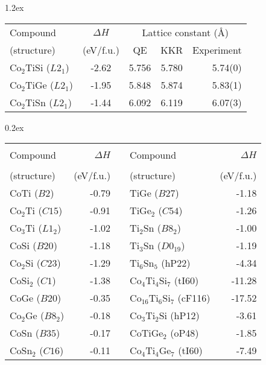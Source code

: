 \documentclass[aps,prb,twocolumn,superscriptaddress,showpacs]{revtex4}
\begin{document}
\begin{table}{\tabcolsep1.2ex
  \begin{tabular}{lcccr}
    Compound & $\Delta H$ & 
    \multicolumn{3}{c}{Lattice constant (\AA)} \\
    (structure) & (eV/f.u.) & QE & KKR & Experiment \\\hline\hline
    Co$_2$TiSi ($L2_1$) & -2.62 & 5.756 & 5.780 & 5.74(0) \\
    Co$_2$TiGe ($L2_1$) & -1.95 & 5.848 & 5.874 & 5.83(1) \\
    Co$_2$TiSn ($L2_1$) & -1.44 & 6.092 & 6.119 & 6.07(3)  \\\hline\hline
  \end{tabular}}
  {\tabcolsep0.2ex
  \begin{tabular}{lrclr}
    Compound & $\Delta H$ & \rule{4ex}{0pt} &  
         Compound & $\Delta H$ \\
    (structure) & (eV/f.u.) & &
    (structure) & (eV/f.u.) \\\hline\hline
   CoTi ($B2$)           &  -0.79 & & TiGe ($B27$)       & -1.18  \\
   Co$_2$Ti ($C15$)      &  -0.91 & & TiGe$_2$ ($C54$)   & -1.26 \\\cline{4-5}
   Co$_3$Ti ($L1_2$)     &  -1.02 & & Ti$_2$Sn ($B8_2$)  & -1.00 \\\cline{1-2}
     CoSi ($B20$)         & -1.18 & & Ti$_3$Sn ($D0_{19}$)  & -1.19 \\
     Co$_2$Si ($C23$)     & -1.29 & & Ti$_6$Sn$_5$ (hP22)  &  -4.34 \\ \cline{4-5}
     CoSi$_2$ ($C1$)      & -1.38 & & Co$_4$Ti$_4$Si$_7$ (tI60) & -11.28 \\
                                     \cline{1-2}
    CoGe ($B20$)          & -0.35 & & Co$_{16}$Ti$_6$Si$_7$ (cF116) & -17.52 \\ 
    Co$_2$Ge ($B8_2$)     & -0.18 & & Co$_3$Ti$_2$Si (hP12) & -3.61 \\ \hline
    CoSn ($B35$)      & -0.17  & & CoTiGe$_2$ (oP48) & -1.85 \\
    CoSn$_2$ ($C16$)  & -0.11  & & Co$_4$Ti$_4$Ge$_7$ (tI60) & -7.49 \\
                                     \cline{1-2}

\end{tabular}}
\end{table}
\end{document}
